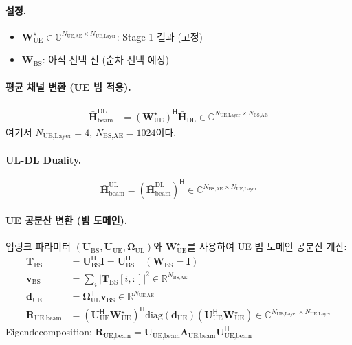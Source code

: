 \documentclass[10pt]{article}
\begin{document}
\paragraph{설정.}
\begin{itemize}
    \item $\mathbf{W}_{\text{UE}}^{\star} \in \mathbb{C}^{N_{\text{UE,AE}} \times N_{\text{UE,Layer}}}$: Stage 1 결과 (고정)
    \item $\mathbf{W}_{\text{BS}}$: 아직 선택 전 (순차 선택 예정)
\end{itemize}

\paragraph{평균 채널 변환 (UE 빔 적용).}
\begin{align}
\bar{\mathbf{H}}_{\text{beam}}^{\text{DL}} &= (\mathbf{W}_{\text{UE}}^{\star})^{\mathsf{H}} \bar{\mathbf{H}}_{\text{DL}} \in \mathbb{C}^{N_{\text{UE,Layer}} \times N_{\text{BS,AE}}}
\end{align}
여기서 $N_{\text{UE,Layer}} = 4$, $N_{\text{BS,AE}} = 1024$이다.

\paragraph{UL-DL Duality.}
\begin{equation}
\bar{\mathbf{H}}_{\text{beam}}^{\text{UL}} = (\bar{\mathbf{H}}_{\text{beam}}^{\text{DL}})^{\mathsf{H}} \in \mathbb{C}^{N_{\text{BS,AE}} \times N_{\text{UE,Layer}}}
\end{equation}

\paragraph{UE 공분산 변환 (빔 도메인).}
업링크 파라미터 $(\mathbf{U}_{\text{BS}}, \mathbf{U}_{\text{UE}}, \boldsymbol{\Omega}_{\text{UL}})$와 $\mathbf{W}_{\text{UE}}^{\star}$를 사용하여 UE 빔 도메인 공분산 계산:
\begin{align}
\mathbf{T}_{\text{BS}} &= \mathbf{U}_{\text{BS}}^{\mathsf{H}} \mathbf{I} = \mathbf{U}_{\text{BS}}^{\mathsf{H}} \quad (\text{$\mathbf{W}_{\text{BS}} = \mathbf{I}$}) \\
\mathbf{v}_{\text{BS}} &= \sum_{i} |\mathbf{T}_{\text{BS}}[i,:]|^2 \in \mathbb{R}^{N_{\text{BS,AE}}} \\
\mathbf{d}_{\text{UE}} &= \boldsymbol{\Omega}_{\text{UL}}^{\mathsf{T}} \mathbf{v}_{\text{BS}} \in \mathbb{R}^{N_{\text{UE,AE}}} \\
\mathbf{R}_{\text{UE,beam}} &= (\mathbf{U}_{\text{UE}}^{\mathsf{H}} \mathbf{W}_{\text{UE}}^{\star})^{\mathsf{H}} \text{diag}(\mathbf{d}_{\text{UE}}) (\mathbf{U}_{\text{UE}}^{\mathsf{H}} \mathbf{W}_{\text{UE}}^{\star}) \in \mathbb{C}^{N_{\text{UE,Layer}} \times N_{\text{UE,Layer}}}
\end{align}
Eigendecomposition: $\mathbf{R}_{\text{UE,beam}} = \mathbf{U}_{\text{UE,beam}} \boldsymbol{\Lambda}_{\text{UE,beam}} \mathbf{U}_{\text{UE,beam}}^{\mathsf{H}}$
\end{document}
